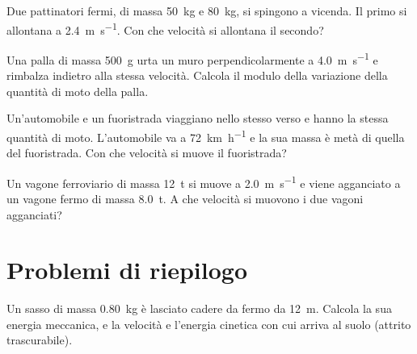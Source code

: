 \begin{esercizio}
Due pattinatori fermi, di massa \SI{50}{\kilo\gram} e \SI{80}{\kilo\gram}, si spingono a vicenda. Il primo si allontana a \SI{2,4}{\metre\per\second}. Con che velocità si allontana il secondo?\\
\end{esercizio}

\begin{esercizio}
Una palla di massa \SI{500}{\gram} urta un muro perpendicolarmente a \SI{4,0}{\metre\per\second} e rimbalza indietro alla stessa velocità. Calcola il modulo della variazione della quantità di moto della palla.\\
\end{esercizio}

\begin{esercizio}
Un'automobile e un fuoristrada viaggiano nello stesso verso e hanno la stessa quantità di moto. L'automobile va a \SI{72}{\kilo\metre\per\hour} e la sua massa è metà di quella del fuoristrada. Con che velocità si muove il fuoristrada?\\
\end{esercizio}

\begin{esercizio}
Un vagone ferroviario di massa \SI{12}{\tonne} si muove a \SI{2,0}{\metre\per\second} e viene agganciato a un vagone fermo di massa \SI{8,0}{\tonne}. A che velocità si muovono i due vagoni agganciati?\\
\end{esercizio}

\section{Problemi di riepilogo}

\begin{esercizio}
Un sasso di massa \SI{0,80}{\kilo\gram} è lasciato cadere da fermo da \SI{12}{\metre}. Calcola la sua energia meccanica, e la velocità e l'energia cinetica con cui arriva al suolo (attrito trascurabile).\\
\end{esercizio}

